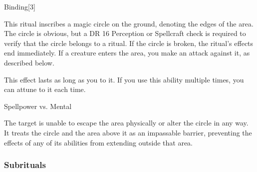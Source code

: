 \begin{spellsection}{Binding}[3]

\begin{spellcontent}

\begin{spelltargetinginfo}



\end{spelltargetinginfo}


\begin{spelleffects}



\spelleffect
This ritual inscribes a magic circle on the ground, denoting the edges of the area.
The circle is obvious, but a DR 16 Perception or Spellcraft check is required to verify that the circle belongs to a  ritual.
If the circle is broken, the ritual's effects end immediately.
If a creature enters the area, you make an attack against it, as described below.

This effect lasts as long as you  to it.
If you use this ability multiple times, you can attune to it each time.




\begin{spellattack}{Spellpower vs. Mental}


\hit
The target is unable to escape the area physically or alter the circle in any way.
It treats the circle and the area above it as an impassable barrier, preventing the effects of any of its abilities from extending outside that area.



\end{spellattack}



\end{spelleffects}

\end{spellcontent}
\begin{spellfooter}


\end{spellfooter}
\begin{spellsubcontent}


\end{spellsubcontent}
\end{spellsection}


\subsubsection{Subrituals}


